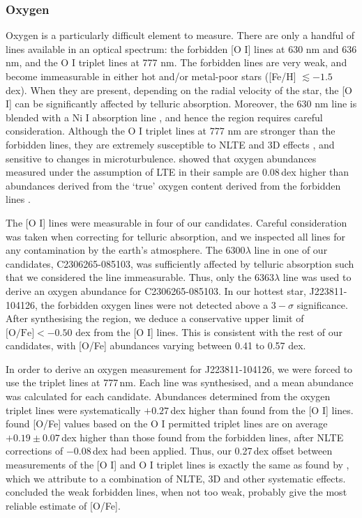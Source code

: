 \documentclass{emulateapj}
\begin{document}
\subsubsection{Oxygen}
Oxygen is a particularly difficult element to measure. There are only a handful of lines available in an optical spectrum: the forbidden [O \textsc{I}] lines at 630 nm and 636 nm, and the O \textsc{I} triplet lines at 777 nm. The forbidden lines are very weak, and become immeasurable in either hot and/or metal-poor stars ([Fe/H] $\lesssim -1.5$ dex). When they are present, depending on the radial velocity of the star, the [O \textsc{I}] can be significantly affected by telluric absorption. Moreover, the 630 nm line is blended with a Ni \textsc{I} absorption line \citep{Allende-Prieto;et-al_2001}, and hence the region requires careful consideration. Although the O \textsc{I} triplet lines at 777 nm are stronger than the forbidden lines, they are extremely susceptible to NLTE and 3D effects \citep{Asplund;Perez_2001}, and sensitive to changes in microturbulence. \citet{Perez;et-al_2006} showed that oxygen abundances measured under the assumption of LTE in their sample are 0.08\,dex higher than abundances derived from the `true' oxygen content derived from the forbidden lines \citep{Perez;et-al_2006}. 

The [O \textsc{I}] lines were measurable in four of our candidates. Careful consideration was taken when correcting for telluric absorption, and we inspected all lines for any contamination by the earth's atmosphere. The 6300$\lambda$ line in one of our candidates, C2306265-085103, was sufficiently affected by telluric absorption such that we considered the line immeasurable. Thus, only the 6363$\lambda$ line was used to derive an oxygen abundance for C2306265-085103. In our hottest star, J223811-104126, the forbidden oxygen lines were not detected above a $3-\sigma$ significance. After synthesising the region, we deduce a conservative upper limit of $\mbox{[O/Fe]} < -0.50$ dex from the [O \textsc{I}] lines. This is consistent with the rest of our candidates, with [O/Fe] abundances varying between 0.41 to 0.57 dex.

In order to derive an oxygen measurement for J223811-104126, we were forced to use the triplet lines at 777\,nm. Each line was synthesised, and a mean abundance was calculated for each candidate. Abundances determined from the oxygen triplet lines were systematically $+0.27$\,dex higher than found from the [O \textsc{I}] lines. \citet{Perez;et-al_2006} found [O/Fe] values based on the O \textsc{I} permitted triplet lines are on average $+0.19 \pm 0.07$\,dex higher than those found from the forbidden lines, after NLTE corrections of $-$0.08\,dex had been applied.  Thus, our 0.27\,dex offset between measurements of the [O \textsc{I}] and O \textsc{I} triplet lines is exactly the same as found by \citet{Perez;et-al_2006}, which we attribute to a combination of NLTE, 3D and other systematic effects. \citet{Perez;et-al_2006} concluded the weak forbidden lines, when not too weak, probably give the most reliable estimate of [O/Fe].
\end{document}
